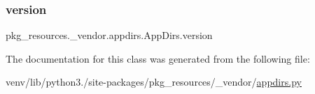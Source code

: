 \mbox{\label{classpkg__resources_1_1__vendor_1_1appdirs_1_1AppDirs_af0b4120c1952529d4b9cf453a36a1939}} 
\subsubsection{\texorpdfstring{version}{version}}
{\footnotesize\ttfamily pkg\+\_\+resources.\+\_\+vendor.\+appdirs.\+App\+Dirs.\+version}



The documentation for this class was generated from the following file\+:\begin{DoxyCompactItemize}
\item 
venv/lib/python3./site-\/packages/pkg\+\_\+resources/\+\_\+vendor/\hyperlink{pkg__resources_2__vendor_2appdirs_8py}{appdirs.\+py}\end{DoxyCompactItemize}
